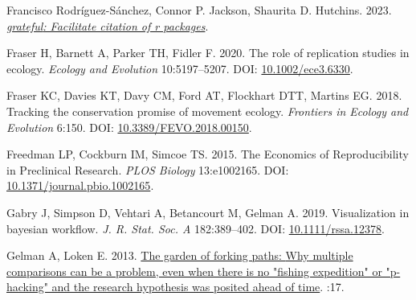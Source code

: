 \documentclass[10pt,a4paper]{article}
\newlength{\cslhangindent}
\newenvironment{CSLReferences}[2] %
 {\begin{list}{}{%
  \setlength{\itemindent}{0pt}
  \setlength{\leftmargin}{0pt}
  \setlength{\parsep}{0pt}
  \ifodd #1
   \setlength{\leftmargin}{\cslhangindent}
   \setlength{\itemindent}{-1\cslhangindent}
  \fi
  \setlength{\itemsep}{#2\baselineskip}}}
 {\end{list}}
\begin{document}
\begin{CSLReferences}{1}{0}
Francisco Rodríguez-Sánchez, Connor P. Jackson, Shaurita D. Hutchins. 2023. \emph{\href{https://github.com/Pakillo/grateful}{{grateful}: Facilitate citation of r packages}}.

Fraser H, Barnett A, Parker TH, Fidler F. 2020. The role of replication studies in ecology. \emph{Ecology and Evolution} 10:5197--5207. DOI: \href{https://doi.org/10.1002/ece3.6330}{10.1002/ece3.6330}.

Fraser KC, Davies KT, Davy CM, Ford AT, Flockhart DTT, Martins EG. 2018. Tracking the conservation promise of movement ecology. \emph{Frontiers in Ecology and Evolution} 6:150. DOI: \href{https://doi.org/10.3389/FEVO.2018.00150}{10.3389/FEVO.2018.00150}.

Freedman LP, Cockburn IM, Simcoe TS. 2015. The {Economics} of {Reproducibility} in {Preclinical} {Research}. \emph{PLOS Biology} 13:e1002165. DOI: \href{https://doi.org/10.1371/journal.pbio.1002165}{10.1371/journal.pbio.1002165}.

Gabry J, Simpson D, Vehtari A, Betancourt M, Gelman A. 2019. Visualization in bayesian workflow. \emph{J. R. Stat. Soc. A} 182:389--402. DOI: \href{https://doi.org/10.1111/rssa.12378}{10.1111/rssa.12378}.

Gelman A, Loken E. 2013. \href{http://www.stat.columbia.edu/~gelman/research/unpublished/p_hacking.pdf}{The garden of forking paths: {Why} multiple comparisons can be a problem, even when there is no "fishing expedition" or "p-hacking" and the research hypothesis was posited ahead of time}. :17.


\end{CSLReferences}
\end{document}
